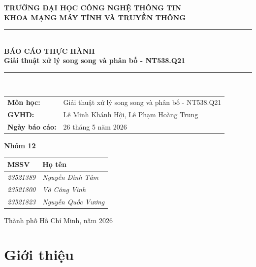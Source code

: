 \documentclass[12pt,a4paper]{article}
\newcommand{\CourseName}{Giải thuật xử lý song song và phân bố - NT538.Q21}
\newcommand{\ReportTitle}{Báo cáo thực hành}
\newcommand{\Instructor}{Lê Minh Khánh Hội, Lê Phạm Hoàng Trung}
\newcommand{\ReportDate}{26 tháng 5 năm 2026}
\begin{document}
\begin{titlepage}
  \centering
  \vspace*{0.8cm}

  {\Large\bfseries TRƯỜNG ĐẠI HỌC CÔNG NGHỆ THÔNG TIN}\\[0.25cm]
  {\large\bfseries KHOA MẠNG MÁY TÍNH VÀ TRUYỀN THÔNG}\\[1.5cm]

  \rule{0.85\textwidth}{0.8pt}\\[0.45cm]
  {\Huge\bfseries\color{primary}\MakeUppercase{\ReportTitle}}\\[0.35cm]
  {\Large\bfseries \CourseName}\\[0.45cm]
  \rule{0.85\textwidth}{0.8pt}\\[1.2cm]

  \begin{tabularx}{0.82\textwidth}{>{\bfseries}p{4cm}Y}
    Môn học: & \CourseName \\
    GVHD: & \Instructor \\
    Ngày báo cáo: & \ReportDate \\
  \end{tabularx}

  \vspace{1.2cm}

  {\Large\bfseries Nhóm 12}\\[0.4cm]
  \begin{tabularx}{0.72\textwidth}{>{\centering\arraybackslash}p{}Y}
    \toprule
    \textbf{MSSV} & \textbf{Họ tên} \\
    \midrule
    \textit{23521389} & \textit{Nguyễn Đình Tâm} \\
    \textit{23521800} & \textit{Võ Công Vinh} \\
    \textit{23521823} & \textit{Nguyễn Quốc Vương} \\
    \bottomrule
  \end{tabularx}

  \vfill
  {\large Thành phố Hồ Chí Minh, năm 2026}
\end{titlepage}

\tableofcontents
\newpage


\section{Giới thiệu}
\end{document}
